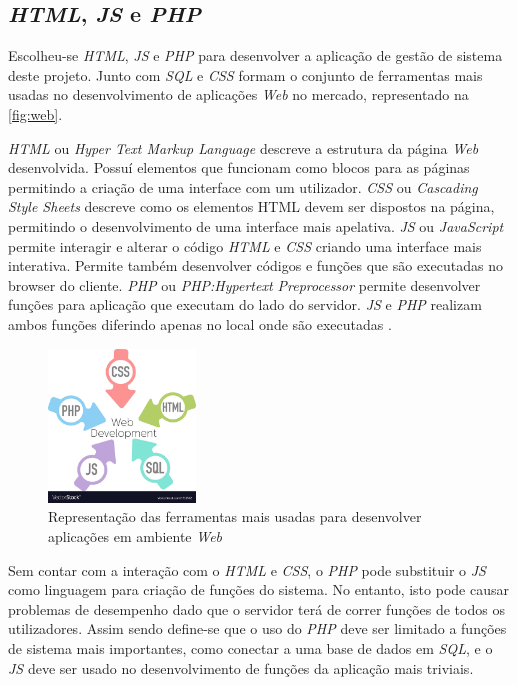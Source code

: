 \documentclass[11pt,twoside,a4paper]{report}
\begin{document}
\subsection{\textit{HTML}, \textit{JS} e \textit{PHP}}
Escolheu-se \textit{HTML}, \textit{JS} e \textit{PHP} para desenvolver a aplicação de gestão de sistema deste projeto. Junto com \textit{SQL} e \textit{CSS} formam o conjunto de ferramentas mais usadas no desenvolvimento de aplicações \textit{Web} no mercado, representado na \autoref{fig:web}.\par 
\textit{HTML} ou \textit{Hyper Text Markup Language} descreve a estrutura da página \textit{Web} desenvolvida. Possuí elementos que funcionam como blocos para as páginas permitindo a criação de uma interface com um utilizador. \textit{CSS} ou \textit{Cascading Style Sheets} descreve como os elementos HTML devem ser dispostos na página, permitindo o desenvolvimento de uma interface mais apelativa. \textit{JS} ou \textit{JavaScript} permite interagir e alterar o código \textit{HTML} e \textit{CSS} criando uma interface mais interativa. Permite também desenvolver códigos e funções que são executadas no browser do cliente. \textit{PHP} ou \textit{PHP:Hypertext Preprocessor} permite desenvolver funções para aplicação que executam do lado do servidor. \textit{JS} e \textit{PHP} realizam ambos funções diferindo apenas no local onde são executadas \cite{web}.\par
\begin{figure}[H]
	\begin{center}
		\includegraphics[trim={0 3cm 0 0},clip,width=0.35\textwidth]{web} %
		\caption[Representação das ferramentas mais usadas para desenvolver aplicações \textit{Web}]{Representação das ferramentas mais usadas para desenvolver aplicações em ambiente \textit{Web} \footnotemark}
		\label{fig:web}
	\end{center}
\end{figure}
Sem contar com a interação com o \textit{HTML} e \textit{CSS}, o \textit{PHP} pode substituir o \textit{JS} como linguagem para criação de funções do sistema. No entanto, isto pode causar problemas de desempenho dado que o servidor terá de correr funções de todos os utilizadores. Assim sendo define-se que o uso do \textit{PHP} deve ser limitado a funções de sistema mais importantes, como conectar a uma base de dados em \textit{SQL}, e o \textit{JS} deve ser usado no desenvolvimento de funções da aplicação mais triviais.
\end{document}

